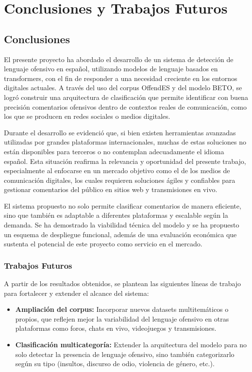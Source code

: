 \chapter{Conclusiones y Trabajos Futuros}

\section{Conclusiones}

El presente proyecto ha abordado el desarrollo de un sistema de detección de lenguaje ofensivo en español, utilizando modelos de lenguaje basados en transformers, con el fin de responder a una necesidad creciente en los entornos digitales actuales. A través del uso del corpus OffendES y del modelo BETO, se logró construir una arquitectura de clasificación que permite identificar con buena precisión comentarios ofensivos dentro de contextos reales de comunicación, como los que se producen en redes sociales o medios digitales.

Durante el desarrollo se evidenció que, si bien existen herramientas avanzadas utilizadas por grandes plataformas internacionales, muchas de estas soluciones no están disponibles para terceros o no contemplan adecuadamente el idioma español. Esta situación reafirma la relevancia y oportunidad del presente trabajo, especialmente al enfocarse en un mercado objetivo como el de los medios de comunicación digitales, los cuales requieren soluciones ágiles y confiables para gestionar comentarios del público en sitios web y transmisiones en vivo.

El sistema propuesto no solo permite clasificar comentarios de manera eficiente, sino que también es adaptable a diferentes plataformas y escalable según la demanda. Se ha demostrado la viabilidad técnica del modelo y se ha propuesto un esquema de despliegue funcional, además de una evaluación económica que sustenta el potencial de este proyecto como servicio en el mercado.

\subsection{Trabajos Futuros}

A partir de los resultados obtenidos, se plantean las siguientes líneas de trabajo para fortalecer y extender el alcance del sistema:

\begin{itemize}
    \item \textbf{Ampliación del corpus:} Incorporar nuevos datasets multitemáticos o propios, que reflejen mejor la variabilidad del lenguaje ofensivo en otras plataformas como foros, chats en vivo, videojuegos y transmisiones.

    \item \textbf{Clasificación multicategoría:} Extender la arquitectura del modelo para no solo detectar la presencia de lenguaje ofensivo, sino también categorizarlo según su tipo (insultos, discurso de odio, violencia de género, etc.).
\end{itemize}

